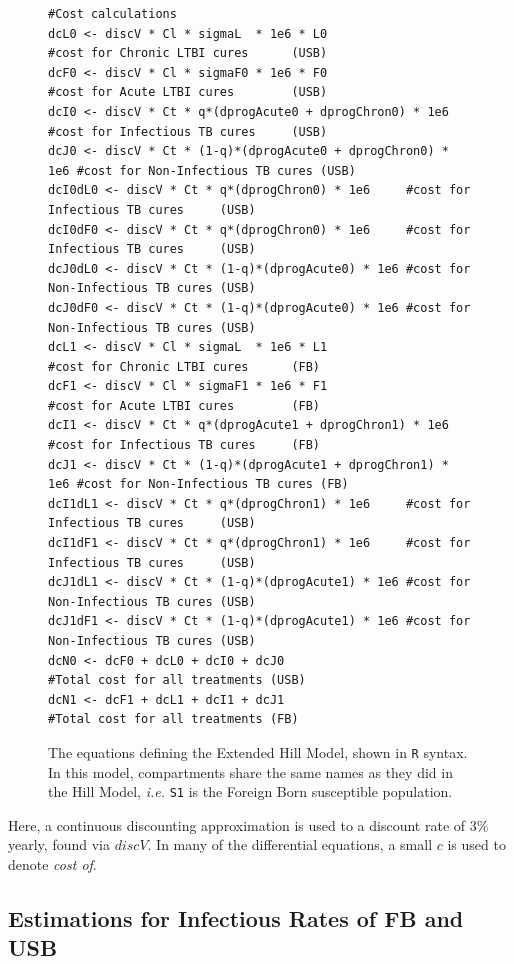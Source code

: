 \documentclass{amsart}
\begin{document}
\begin{figure}[h]
\begin{center}
{\begin{verbatim}
#Cost calculations
dcL0 <- discV * Cl * sigmaL  * 1e6 * L0                    #cost for Chronic LTBI cures      (USB)
dcF0 <- discV * Cl * sigmaF0 * 1e6 * F0                    #cost for Acute LTBI cures        (USB)
dcI0 <- discV * Ct * q*(dprogAcute0 + dprogChron0) * 1e6     #cost for Infectious TB cures     (USB)
dcJ0 <- discV * Ct * (1-q)*(dprogAcute0 + dprogChron0) * 1e6 #cost for Non-Infectious TB cures (USB)
dcI0dL0 <- discV * Ct * q*(dprogChron0) * 1e6     #cost for Infectious TB cures     (USB)
dcI0dF0 <- discV * Ct * q*(dprogChron0) * 1e6     #cost for Infectious TB cures     (USB)
dcJ0dL0 <- discV * Ct * (1-q)*(dprogAcute0) * 1e6 #cost for Non-Infectious TB cures (USB)
dcJ0dF0 <- discV * Ct * (1-q)*(dprogAcute0) * 1e6 #cost for Non-Infectious TB cures (USB)
dcL1 <- discV * Cl * sigmaL  * 1e6 * L1                    #cost for Chronic LTBI cures      (FB)
dcF1 <- discV * Cl * sigmaF1 * 1e6 * F1                    #cost for Acute LTBI cures        (FB)
dcI1 <- discV * Ct * q*(dprogAcute1 + dprogChron1) * 1e6     #cost for Infectious TB cures     (FB)
dcJ1 <- discV * Ct * (1-q)*(dprogAcute1 + dprogChron1) * 1e6 #cost for Non-Infectious TB cures (FB)
dcI1dL1 <- discV * Ct * q*(dprogChron1) * 1e6     #cost for Infectious TB cures     (USB)
dcI1dF1 <- discV * Ct * q*(dprogChron1) * 1e6     #cost for Infectious TB cures     (USB)
dcJ1dL1 <- discV * Ct * (1-q)*(dprogAcute1) * 1e6 #cost for Non-Infectious TB cures (USB)
dcJ1dF1 <- discV * Ct * (1-q)*(dprogAcute1) * 1e6 #cost for Non-Infectious TB cures (USB)
dcN0 <- dcF0 + dcL0 + dcI0 + dcJ0                            #Total cost for all treatments (USB)
dcN1 <- dcF1 + dcL1 + dcI1 + dcJ1                            #Total cost for all treatments (FB)
    \end{verbatim}
  }
  \end{center}
  \label{fig:extendedHillEqs}
  \caption{
    The equations defining the Extended Hill Model, shown in \texttt{R} syntax.
    In this model, compartments share the same names as they did in the Hill
    Model, \emph{i.e.} \texttt{S1} is the Foreign Born susceptible population. 
  }
\end{figure}
Here, a continuous discounting approximation is used to a discount rate of $3\%$
yearly, found via $discV$. In many of the differential equations, a small $c$ is
used to denote \emph{cost of}. 
\FloatBarrier
\subsection{Estimations for Infectious Rates of FB and USB}
\end{document}
